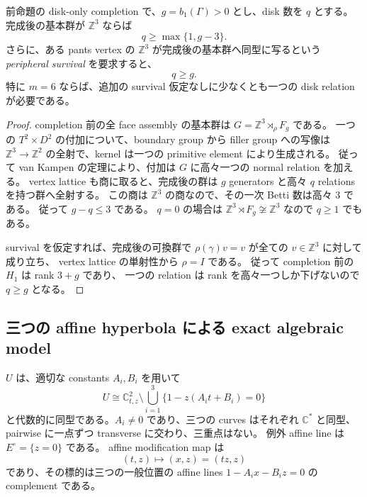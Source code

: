 \begin{proposition}
\label{cs7:diskrelations}
前命題の disk-only completion で、$g=b_1(\Gamma)>0$ とし、disk 数を $q$ とする。
完成後の基本群が $\mathbb Z^3$ ならば
\[
 q\geq\max\{1,g-3\}.
\]
さらに、ある pants vertex の $\mathbb Z^3$ が完成後の基本群へ同型に写るという
\emph{peripheral survival} を要求すると、
\[
 q\geq g.
\]
特に $m=6$ ならば、追加の survival 仮定なしに少なくとも一つの disk relation が必要である。
\end{proposition}

\begin{proof}
completion 前の全 face assembly の基本群は
$G=\mathbb Z^3\rtimes_\rho F_g$ である。
一つの $T^2\times D^2$ の付加について、boundary group から filler group への写像は
$\mathbb Z^3\to\mathbb Z^2$ の全射で、kernel は一つの primitive element により生成される。
従って van Kampen の定理により、付加は $G$ に高々一つの normal relation を加える。
vertex lattice も商に取ると、完成後の群は $g$ generators と高々 $q$ relations を持つ群へ全射する。
この商は $\mathbb Z^3$ の商なので、その一次 Betti 数は高々 $3$ である。
従って $g-q\leq3$ である。
$q=0$ の場合は $\mathbb Z^3\rtimes F_g\not\cong\mathbb Z^3$ なので $q\geq1$ でもある。

survival を仮定すれば、完成後の可換群で
$\rho(\gamma)v=v$ が全ての $v\in\mathbb Z^3$ に対して成り立ち、
vertex lattice の単射性から $\rho=I$ である。
従って completion 前の $H_1$ は rank $3+g$ であり、
一つの relation は rank を高々一つしか下げないので $q\geq g$ となる。
\end{proof}

\subsection{三つの affine hyperbola による exact algebraic model}

\begin{proposition}
\label{cs7:hyperbola}
$U$ は、適切な constants $A_i,B_i$ を用いて
\begin{equation}
 U\cong\mathbb C^2_{t,z}\setminus
 \bigcup_{i=1}^3\{1-z(A_it+B_i)=0\}
 \label{cs7:hyperbolachart}
\end{equation}
と代数的に同型である。$A_i\ne0$ であり、三つの curves はそれぞれ
$\mathbb C^*$ と同型、pairwise に一点ずつ transverse に交わり、三重点はない。
例外 affine line は $E^\circ=\{z=0\}$ である。
affine modification map は
\begin{equation}
 (t,z)\longmapsto(x,z)=(tz,z)
 \label{cs7:modmap}
\end{equation}
であり、その標的は三つの一般位置の affine lines
$1-A_i x-B_i z=0$ の complement である。
\end{proposition}

